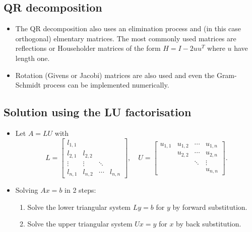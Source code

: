 \documentclass[11pt]{article}
\begin{document}
    \subsection{QR decomposition}\label{qr-decomposition}

\begin{itemize}
\item
  The QR decomposition also uses an elimination process and (in this
  case orthogonal) elmentary matrices. The most commonly used matrices
  are reflections or Householder matrices of the form
  \(H = I - 2 u u^T\) where \(u\) have length one.
\item
  Rotation (Givens or Jacobi) matrices are also used and even the
  Gram-Schmidt process can be implemented numerically.
\end{itemize}

    \subsection{Solution using the LU
factorisation}\label{solution-using-the-lu-factorisation}

\begin{itemize}
\item
  Let \(A=LU\) with \[L = \left[\begin{array}{cccccc}
  l_{1,1} &   &  &     \\
  l_{2,1} & l_{2,2} &     &\\
  \vdots       & \vdots      &    \ddots      &\\
  l_{n,1} & l_{n,2} & \cdots  & l_{n,n}
  \end{array}\right], \quad
  U = \left[ \begin{array}{cccccc}
  u_{1,1} & u_{1,2} & \cdots & u_{1,n} \\
      & u_{2,2} & \cdots & u_{2,n} \\
      &         & \ddots &  \vdots \\
      &         &        & u_{n,n}
  \end{array}\right].\]
\item
  Solving \(Ax=b\) in 2 steps:

  \begin{enumerate}
  \def\labelenumi{\arabic{enumi}.}
  \item
    Solve the lower triangular system \(Ly =b\) for \(y\) by forward
    substitution.
  \item
    Solve the upper triangular system \(U x = y\) for \(x\) by back
    substitution.
  \end{enumerate}
\end{itemize}
\end{document}

